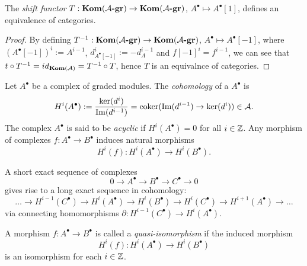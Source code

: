 \begin{corollary}
    The \textit{shift functor} $T: \textrm{\textup{\textbf{Kom}}}(\mathcal{A\textrm{\textup{\textbf{-gr}}}}) \rightarrow \textrm{\textup{\textbf{Kom}}}(\mathcal{A\textrm{\textup{\textbf{-gr}}}})$, $A^\bullet \mapsto A^\bullet[1]$, defines an equivalence of categories.
\end{corollary}

\begin{proof}
    By defining $T^{-1}: \textrm{\textup{\textbf{Kom}}}(\mathcal{A\textrm{\textup{\textbf{-gr}}}}) \rightarrow \textrm{\textup{\textbf{Kom}}}(\mathcal{A\textrm{\textup{\textbf{-gr}}}})$, $A^\bullet \mapsto A^\bullet[-1]$, where $(A^\bullet[-1])^i := A^{i-1}$, $d^i_{A^\bullet[-1]} := -d^{i-1}_A$ and $f[-1]^i = f^{i-1}$, we can see that $t \circ T^{-1} = id_{\textrm{\textup{\textbf{Kom}}}(\mathcal{A})} = T^{-1} \circ T$, hence $T$ is an equivalnce of categories.
\end{proof}

\begin{remark}
    Let $A^\bullet$ be a complex of graded modules.
    The \textit{cohomology} of a $A^\bullet$ is $$H^i(A^\bullet) := \frac{\ker(d^i)}{\operatorname{Im}(d^{i-1})} = \operatorname{coker}(\operatorname{Im}(d^{i-1}) \rightarrow \ker(d^i)) \in \mathcal{A}.$$
    The complex $A^\bullet$ is said to be \textit{acyclic} if $H^i(A^\bullet) = 0$ for all $i \in {\mathbb Z}$.
    Any morphism of complexes $f: A^\bullet \rightarrow B^\bullet$ induces natural morphisms $$H^i(f): H^i(A^\bullet) \rightarrow H^i(B^\bullet).$$
\end{remark}

\begin{remark}
    A short exact sequence of complexes $$0 \rightarrow A^\bullet \rightarrow B^\bullet \rightarrow C^\bullet \rightarrow 0$$ gives rise to a long exact sequence in cohomology:
    \[
        \dots \rightarrow H^{i-1}(C^\bullet) \rightarrow H^{i}(A^\bullet) \rightarrow H^{i}(B^\bullet) \rightarrow H^{i}(C^\bullet) \rightarrow H^{i+1}(A^\bullet) \rightarrow \dots
    \]
    via connecting homomorphisms $\partial: H^{i-1}(C^\bullet) \rightarrow H^i(A^\bullet)$.
\end{remark}

\begin{definition}
    A morphism $f: A^\bullet \rightarrow B^\bullet$ is called a \textit{quasi-isomorphism} if the induced morphism $$H^i(f): H^i(A^\bullet) \rightarrow H^i(B^\bullet)$$ is an isomorphism for each $i \in {\mathbb Z}$.
\end{definition}